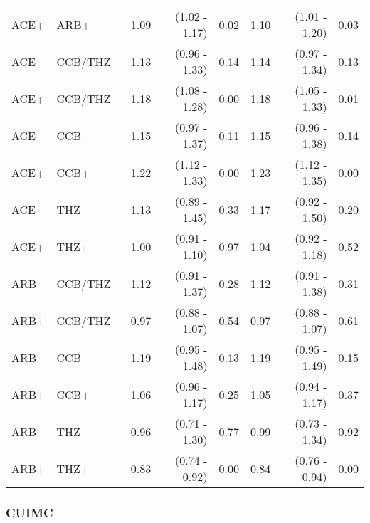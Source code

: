 \documentclass[11pt,]{article}
\begin{document}
\begin{table}[H]
{\begin{tabular}{llrrrrrr}
  ACE+ & ARB+ & 1.09 & (1.02 - 1.17) & 0.02 & 1.10 & (1.01 - 1.20) & 0.03 \\ 
  ACE & CCB/THZ & 1.13 & (0.96 - 1.33) & 0.14 & 1.14 & (0.97 - 1.34) & 0.13 \\ 
  ACE+ & CCB/THZ+ & 1.18 & (1.08 - 1.28) & 0.00 & 1.18 & (1.05 - 1.33) & 0.01 \\ 
  ACE & CCB & 1.15 & (0.97 - 1.37) & 0.11 & 1.15 & (0.96 - 1.38) & 0.14 \\ 
  ACE+ & CCB+ & 1.22 & (1.12 - 1.33) & 0.00 & 1.23 & (1.12 - 1.35) & 0.00 \\ 
  ACE & THZ & 1.13 & (0.89 - 1.45) & 0.33 & 1.17 & (0.92 - 1.50) & 0.20 \\ 
  ACE+ & THZ+ & 1.00 & (0.91 - 1.10) & 0.97 & 1.04 & (0.92 - 1.18) & 0.52 \\ 
  ARB & CCB/THZ & 1.12 & (0.91 - 1.37) & 0.28 & 1.12 & (0.91 - 1.38) & 0.31 \\ 
  ARB+ & CCB/THZ+ & 0.97 & (0.88 - 1.07) & 0.54 & 0.97 & (0.88 - 1.07) & 0.61 \\ 
  ARB & CCB & 1.19 & (0.95 - 1.48) & 0.13 & 1.19 & (0.95 - 1.49) & 0.15 \\ 
  ARB+ & CCB+ & 1.06 & (0.96 - 1.17) & 0.25 & 1.05 & (0.94 - 1.17) & 0.37 \\ 
  ARB & THZ & 0.96 & (0.71 - 1.30) & 0.77 & 0.99 & (0.73 - 1.34) & 0.92 \\ 
  ARB+ & THZ+ & 0.83 & (0.74 - 0.92) & 0.00 & 0.84 & (0.76 - 0.94) & 0.00 \\ 
    \bottomrule
  \end{tabular}
  }
\end{table}

\hypertarget{cuimc-3}{%
\subsubsection{CUIMC}\label{cuimc-3}}
\end{document}

